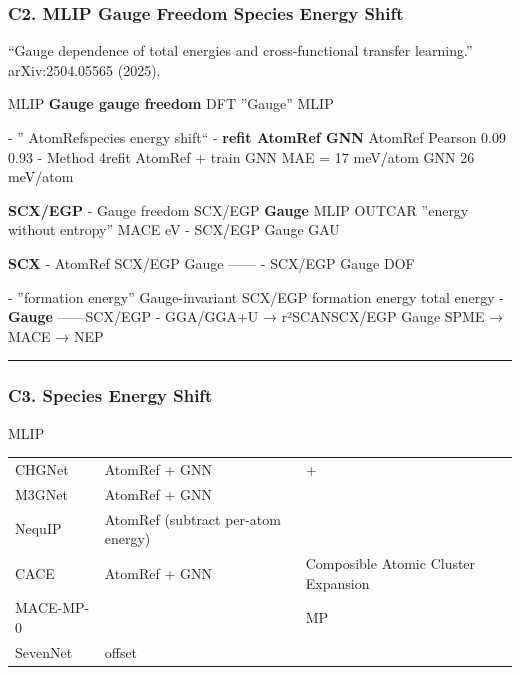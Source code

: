 \documentclass[
  12pt,
]{article}
\begin{document}
\subsubsection{C2. MLIP Gauge Freedom  Species Energy
Shift}\label{c2.-mlip-gauge-freedom-ux4e0e-species-energy-shift}

\textbf{} ``Gauge dependence of total energies and
cross-functional transfer learning.'' arXiv:2504.05565 (2025).

\textbf{}  MLIP  \textbf{Gauge gauge
freedom} DFT
''Gauge''
MLIP 

\textbf{} - ''
AtomRefspecies energy shift`` - \textbf{}
\textbf{ refit AtomRef  GNN}
 AtomRef  Pearson  0.09  0.93
- Method 4refit AtomRef + train GNN MAE = 17
meV/atom GNN  26 meV/atom

\textbf{ SCX/EGP } - \textbf{} Gauge freedom 
SCX/EGP  \textbf{Gauge } MLIP
OUTCAR ''energy
without entropy'' MACE  eV - SCX/EGP  Gauge
GAU

\textbf{SCX } -  AtomRef
SCX/EGP  Gauge
\textbf{}------
- SCX/EGP  Gauge
\textbf{} DOF 

\textbf{} - ''formation energy''
Gauge-invariant SCX/EGP  formation energy
 total energy  -
\textbf{ Gauge }------SCX/EGP
 - GGA/GGA+U →
r²SCANSCX/EGP  Gauge SPME → MACE →
NEP

\begin{center}\rule{0.5\linewidth}{0.5pt}\end{center}

\subsubsection{C3. Species Energy Shift
}\label{c3.-species-energy-shift-ux6807ux51c6ux505aux6cd5}

 MLIP 

\begin{longtable}[]{@{}lll@{}}
\toprule\noalign{}
 &  &  \\
\midrule\noalign{}
\endhead
\bottomrule\noalign{}
\endlastfoot
CHGNet & AtomRef + GNN &  +  \\
M3GNet & AtomRef + GNN &  \\
NequIP & AtomRef (subtract per-atom energy) &  \\
CACE & AtomRef + GNN & Composible Atomic Cluster Expansion \\
MACE-MP-0 &  &  MP  \\
SevenNet &  offset &  \\
\end{longtable}
\end{document}
